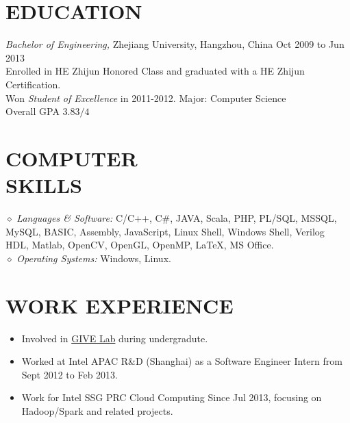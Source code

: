 \documentclass[line,margin]{res}
\begin{document}
\address{Cellphone:\sl 15216861267}
\address{E-mail:\sl me@daoyuan.wang}


\begin{resume}


\section{EDUCATION} {\sl Bachelor of Engineering,} Zhejiang University, Hangzhou, China \hfill Oct 2009 to Jun 2013\\
                Enrolled in HE Zhijun Honored Class and graduated with a HE Zhijun Certification.\\
                Won {\sl Student of Excellence} in 2011-2012.
                Major: Computer Science \\
                Overall GPA $3.83/4$

\section{COMPUTER \\ SKILLS} {$\diamond$ \sl Languages \& Software:} C/C++, C\#, JAVA, Scala, PHP, PL/SQL, MSSQL, MySQL, BASIC, Assembly, JavaScript, Linux Shell, Windows Shell, Verilog HDL, Matlab, OpenCV, OpenGL, OpenMP, \LaTeX, MS Office. \\
                {$\diamond$ \sl Operating Systems:} Windows, Linux.
                
\section{WORK EXPERIENCE}
            \begin{itemize}
            \item Involved in \href{http://give.zju.edu.cn/en/portal/index.html}{GIVE Lab} during undergradute.
            \item Worked at Intel APAC R\&D (Shanghai) as a Software Engineer Intern from Sept 2012 to Feb 2013.
            \item Work for Intel SSG PRC Cloud Computing Since Jul 2013, focusing on Hadoop/Spark and related projects.
            \end{itemize}


\end{resume}
\end{document}
